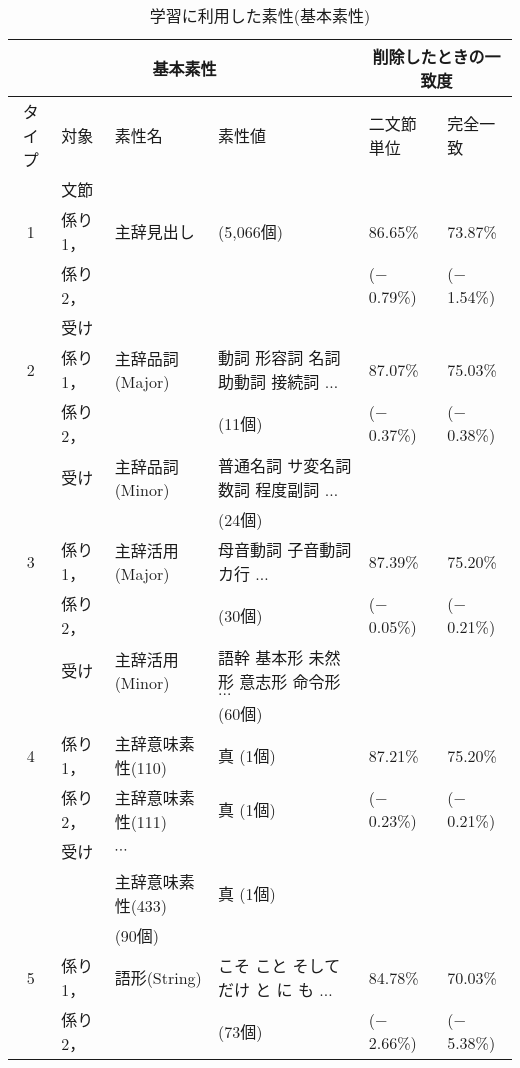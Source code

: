 \begin{table}[htbp]
  \scriptsize
  \begin{center}
    \caption{学習に利用した素性(基本素性)}
    \label{table:feature1}
    \leavevmode
    \renewcommand{\arraystretch}{}
    \begin{tabular}[c]{|c|l|l|l|l|l|}
      \hline
      \multicolumn{4}{|c|}{\bf 基本素性} 
      & \multicolumn{2}{|c|}{削除したときの一致度}\\
      \hline
      タイプ & 対象 & 素性名 & 素性値 & 二文節単位 & 完全一致 \\
      & 文節 & & & & \\
      \hline
      \hline
      1 & 係り1，
      & 主辞見出し & (5,066個) & 86.65\% & 73.87\% \\
      & 係り2，& & & ($-$0.79\%) & ($-$1.54\%) \\
      & 受け & & & & \\
      \hline
      2 & 係り1，
      & 主辞品詞(Major) 
      & 動詞 形容詞 名詞 助動詞 接続詞 $\ldots$ & 87.07\% & 75.03\% \\
      & 係り2， & & \q\q\q\q\q\q (11個) & ($-$0.37\%) & ($-$0.38\%) \\
      & 受け & 主辞品詞(Minor) 
      & 普通名詞 サ変名詞 数詞 程度副詞 $\ldots$ & & \\
      & & & \q\q\q\q\q\q (24個) & & \\
      \hline
      3 & 係り1，
      & 主辞活用(Major) & 母音動詞 子音動詞カ行 $\ldots$ & 87.39\% & 75.20\% \\
      & 係り2， & & \q\q\q\q\q\q (30個) & ($-$0.05\%) & ($-$0.21\%) \\
      & 受け & 主辞活用(Minor) & 語幹 基本形 未然形 意志形 命令形 $\ldots$ 
      & & \\
      & & & \q\q\q\q\q\q (60個) & & \\
      \hline
      4 & 係り1，
      & 主辞意味素性(110) & 真 (1個) & 87.21\% & 75.20\% \\
      & 係り2， & 主辞意味素性(111) & 真 (1個) 
      & ($-$0.23\%) & ($-$0.21\%)\\
      & 受け & $\cdots$ & & & \\
      & & 主辞意味素性(433) & 真 (1個) & & \\
      & & (90個) & & & \\
      \hline
      5 & 係り1，
      & 語形(String) & こそ こと そして だけ と に も $\ldots$ 
      & 84.78\% & 70.03\% \\
      & 係り2， & & \q\q\q\q\q\q (73個) & ($-$2.66\%) & ($-$5.38\%) \\

\end{tabular}
\end{center}
\end{table}
